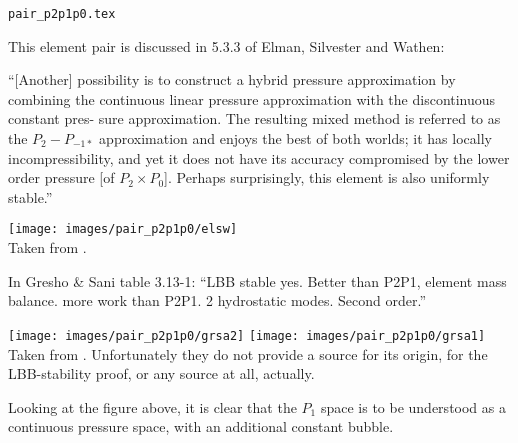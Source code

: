 \begin{flushright} {\tiny {\color{gray} \tt pair\_p2p1p0.tex}} \end{flushright}

This element pair is discussed in 5.3.3 of Elman, Silvester and Wathen: 

``[Another] possibility is to construct a hybrid pressure approximation by 
combining the continuous linear pressure approximation with the discontinuous constant pres-
sure approximation. The resulting mixed method is referred to as the $P_2-P_{-1*}$ 
approximation and enjoys the best of both worlds; it has locally 
incompressibility, and yet it does not have its accuracy compromised by
the lower order pressure [of $P_2\times P_0$]. 
Perhaps surprisingly, this element is also uniformly stable.'' 

\begin{center}
\texttt{[image: images/pair\_p2p1p0/elsw]}\\
{\captionfont Taken from \textcite{elsw}.}
\end{center}

In Gresho \& Sani table 3.13-1: ``LBB stable yes. Better than P2P1, element mass balance.
more work than P2P1. 2 hydrostatic modes. Second order.'' 

\begin{center}
\texttt{[image: images/pair\_p2p1p0/grsa2]}
\texttt{[image: images/pair\_p2p1p0/grsa1]}\\
{\captionfont Taken from \textcite{grsa}. Unfortunately they do not provide a source for 
its origin, for the LBB-stability proof, or any source at all, actually.}
\end{center}

Looking at the figure above, it is clear that the $P_1$ space is to be understood 
as a continuous pressure space, with an additional constant bubble. 

